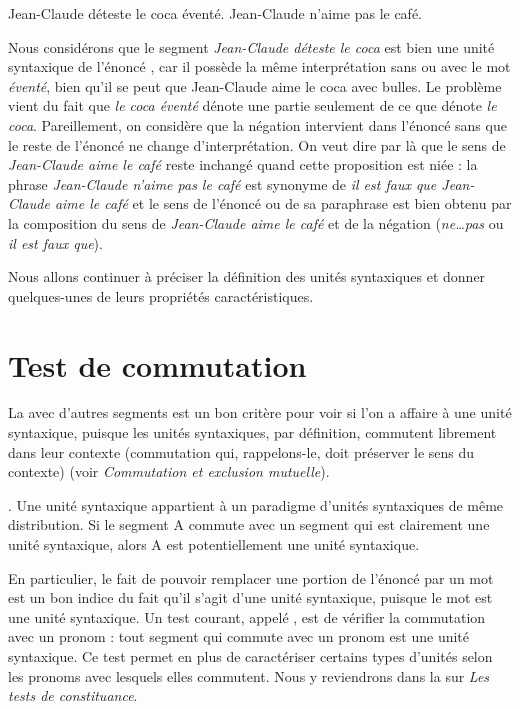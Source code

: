 \ea%
    \label{ex:key:1}
          {Jean-Claude}  {déteste}  {le}  {coca}  {éventé.}
\ex%
    \label{ex:key:2}
          {Jean-Claude}  {n’aime}  {pas}  {le}  {café.}
\z

Nous considérons que le segment \textit{Jean-Claude déteste le coca} est bien une unité syntaxique de l’énoncé , car il possède la même interprétation sans ou avec le mot \textit{éventé}, bien qu’il se peut que Jean-Claude aime le coca avec bulles. Le problème vient du fait que \textit{le coca éventé} dénote une partie seulement de ce que dénote \textit{le coca}. Pareillement, on considère que la négation intervient dans l’énoncé  sans que le reste de l’énoncé ne change d’interprétation. On veut dire par là que le sens de \textit{Jean-Claude aime le café} reste inchangé quand cette proposition est niée : la phrase \textit{Jean-Claude n’aime pas le café} est synonyme de \textit{il est faux que Jean-Claude aime le café} et le sens de l’énoncé  ou de sa paraphrase est bien obtenu par la composition du sens de \textit{Jean-Claude aime le café} et de la négation (\textit{ne…pas} ou \textit{il est faux que}).

Nous allons continuer à préciser la définition des unités syntaxiques et donner quelques-unes de leurs propriétés caractéristiques.

\section{Test de commutation}\label{sec:3.2.10}

La  avec d’autres segments est un bon critère pour voir si l’on a affaire à une unité syntaxique, puisque les unités syntaxiques, par définition, commutent librement dans leur contexte (commutation qui, rappelons-le, doit préserver le sens du contexte) (voir  \textit{Commutation et exclusion mutuelle}).

{. Une unité syntaxique appartient à un paradigme d’unités syntaxiques de même distribution. Si le segment A commute avec un segment qui est clairement une unité syntaxique, alors A est potentiellement une unité syntaxique.}

En particulier, le fait de pouvoir remplacer une portion de l’énoncé par un mot est un bon indice du fait qu’il s’agit d’une unité syntaxique, puisque le mot est une unité syntaxique. Un test courant, appelé , est de vérifier la commutation avec un pronom : tout segment qui commute avec un pronom est une unité syntaxique. Ce test permet en plus de caractériser certains types d’unités selon les pronoms avec lesquels elles commutent. Nous y reviendrons dans la  sur \textit{Les tests de constituance}.

